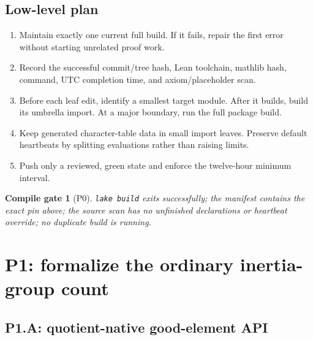 \documentclass[11pt]{article}
\newtheorem{gate}{Compile gate}
\begin{document}
\subsection*{Low-level plan}

\begin{enumerate}[label=\textbf{P0.\arabic*.},leftmargin=*]
  \item Maintain exactly one current full build.  If it fails, repair the
  first error without starting unrelated proof work.
  \item Record the successful commit/tree hash, Lean toolchain, mathlib
  hash, command, UTC completion time, and axiom/placeholder scan.
  \item Before each leaf edit, identify a smallest target module.  After
  it builds, build its umbrella import.  At a major boundary, run the full
  package build.
  \item Keep generated character-table data in small import leaves.
  Preserve default heartbeats by splitting evaluations rather than raising
  limits.
  \item Push only a reviewed, green state and enforce the twelve-hour
  minimum interval.
\end{enumerate}

\begin{gate}[P0]
\texttt{lake build} exits successfully; the manifest contains the exact
pin above; the source scan has no unfinished declarations or heartbeat
override; no duplicate build is running.
\end{gate}

\section{P1: formalize the ordinary inertia-group count}

\subsection{P1.A: quotient-native good-element API}
\end{document}
